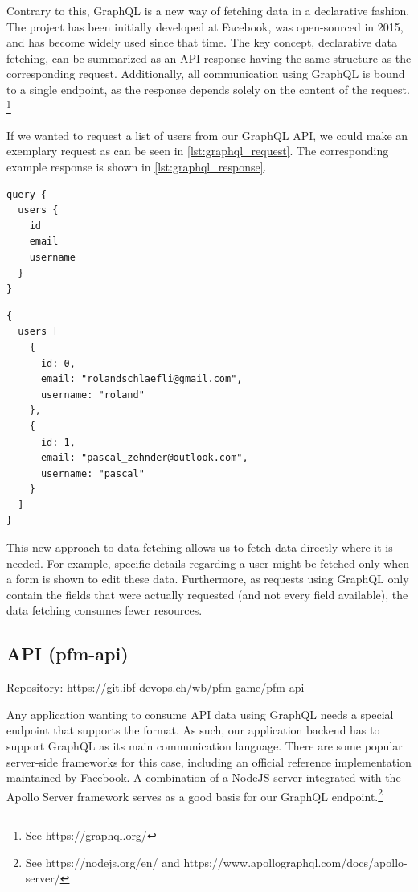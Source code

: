 Contrary to this, GraphQL is a new way of fetching data in a declarative fashion. The project has been initially developed at Facebook, was open-sourced in 2015, and has become widely used since that time. The key concept, declarative data fetching, can be summarized as an API response having the same structure as the corresponding request. Additionally, all communication using GraphQL is bound to a single endpoint, as the response depends solely on the content of the request. \footnote{See https://graphql.org/}

If we wanted to request a list of users from our GraphQL API, we could make an exemplary request as can be seen in \cref{lst:graphql_request}. The corresponding example response is shown in \cref{lst:graphql_response}.

\begin{multicols}{2}
  \begin{lstlisting}[caption=GraphQL request, label=lst:graphql_request]
query {
  users {
    id
    email
    username
  }
}
  \end{lstlisting}
  \vfill
  \columnbreak
  \begin{lstlisting}[caption=GraphQL response, label=lst:graphql_response]
{
  users [
    {
      id: 0,
      email: "rolandschlaefli@gmail.com",
      username: "roland"
    },
    {
      id: 1,
      email: "pascal_zehnder@outlook.com",
      username: "pascal"
    }
  ]
}
  \end{lstlisting}
\end{multicols}

This new approach to data fetching allows us to fetch data directly where it is needed. For example, specific details regarding a user might be fetched only when a form is shown to edit these data. Furthermore, as requests using GraphQL only contain the fields that were actually requested (and not every field available), the data fetching consumes fewer resources.


\subsection{API (pfm-api)}

Repository: https://git.ibf-devops.ch/wb/pfm-game/pfm-api

Any application wanting to consume API data using GraphQL needs a special endpoint that supports the format. As such, our application backend has to support GraphQL as its main communication language. There are some popular server-side frameworks for this case, including an official reference implementation maintained by Facebook. A combination of a NodeJS server integrated with the Apollo Server framework serves as a good basis for our GraphQL endpoint.\footnote{See https://nodejs.org/en/ and https://www.apollographql.com/docs/apollo-server/}

